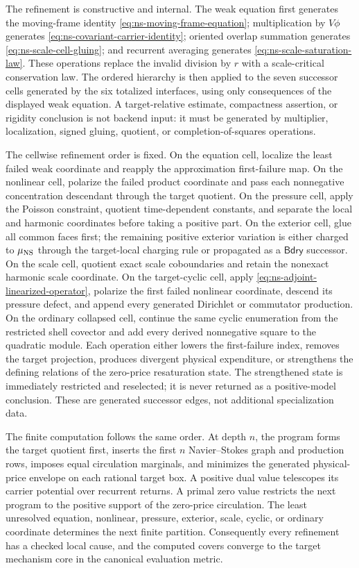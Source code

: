\documentclass[11pt]{article}
\numberwithin{section}{part}
\theoremstyle{plain}
\theoremstyle{definition}
\theoremstyle{remark}
\newcommand{\Bdry}{\mathsf{Bdry}}
\begin{document}
The refinement is constructive and internal.  The weak equation first
generates the moving-frame identity
\eqref{eq:ns-moving-frame-equation}; multiplication by \(V\phi\) generates
\eqref{eq:ns-covariant-carrier-identity}; oriented overlap summation generates
\eqref{eq:ns-scale-cell-gluing}; and recurrent averaging generates
\eqref{eq:ns-scale-saturation-law}.  These operations replace the invalid
division by \(r\) with a scale-critical conservation law.  The ordered
hierarchy is then applied to the seven successor cells generated by the six
totalized interfaces, using only consequences
of the displayed weak equation.  A target-relative estimate, compactness
assertion, or rigidity conclusion is not backend input: it must be generated
by multiplier, localization, signed gluing, quotient, or
completion-of-squares operations.

The cellwise refinement order is fixed.  On the equation cell, localize the
least failed weak coordinate and reapply the approximation first-failure map.
On the nonlinear cell, polarize the failed product coordinate and pass each
nonnegative concentration descendant through the target quotient.  On the
pressure cell, apply the Poisson constraint, quotient time-dependent
constants, and separate the local and harmonic coordinates before taking a
positive part.  On the exterior cell, glue all common faces first; the
remaining positive exterior variation is either charged to
\(\mu_{\rm NS}\) through the target-local charging rule or propagated as a
\(\Bdry\) successor.  On the scale cell,
quotient exact scale coboundaries and retain the nonexact harmonic scale
coordinate.  On the target-cyclic cell, apply
\eqref{eq:ns-adjoint-linearized-operator}, polarize the first failed nonlinear
coordinate, descend its pressure defect, and append every generated
Dirichlet or commutator production.  On the ordinary collapsed cell,
continue the same cyclic enumeration from the restricted shell covector and
add every derived nonnegative square to the quadratic module.  Each operation either
lowers the first-failure index, removes the target projection, produces
divergent physical expenditure, or strengthens the defining relations of the
zero-price resaturation state.  The strengthened state is immediately
restricted and reselected; it is never returned as a positive-model
conclusion.  These are generated successor edges, not additional
specialization data.

The finite computation follows the same order.  At depth \(n\), the program
forms the target quotient first, inserts the first \(n\) Navier--Stokes graph
and production rows, imposes equal circulation marginals, and minimizes the
generated physical-price envelope on each rational target box.  A positive
dual value telescopes its carrier potential over recurrent returns.  A
primal zero value restricts the next program to the positive support of the
zero-price circulation.  The least unresolved equation, nonlinear, pressure,
exterior, scale, cyclic, or ordinary coordinate determines the next finite
partition.  Consequently every refinement has a checked local cause, and
the computed covers converge to the target mechanism core in the canonical
evaluation metric.
\end{document}
